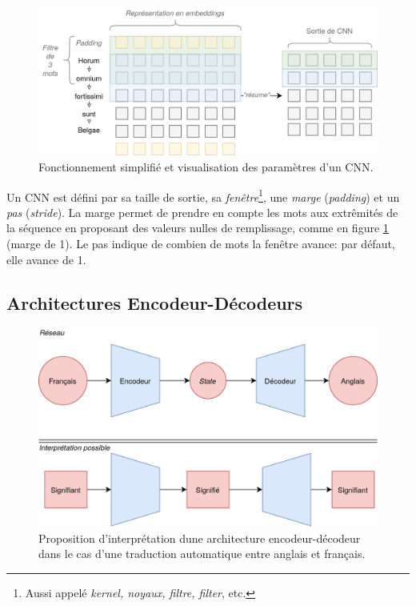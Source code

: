 \begin{figure}[h]
    \centering
    \includegraphics[width=\linewidth]{results/deep-learning/explanations/CNN.png}
    \caption{Fonctionnement simplifié et visualisation des paramètres d'un CNN.}
    \label{fig:deep-learning:cnn-tal}
\end{figure}

Un CNN est défini par sa taille de sortie, sa \textit{fenêtre}\footnote{Aussi appelé \textit{kernel, noyaux, filtre, filter}, etc.}, une \textit{marge} (\textit{padding}) et un \textit{pas} (\textit{stride}). La marge permet de prendre en compte les mots aux extrêmités de la séquence en proposant des valeurs nulles de remplissage, comme en figure \ref{fig:deep-learning:cnn-tal} (marge de 1). Le pas indique de combien de mots la fenêtre avance: par défaut, elle avance de 1. 

\subsection{Architectures Encodeur-Décodeurs}
\label{deep-learning:encoder-decoder}

\begin{figure}[h]
    \centering
    \includegraphics[width=\linewidth]{results/deep-learning/explanations/EncodeurDecodeur.png}
    \caption{Proposition d'interprétation dune architecture encodeur-décodeur dans le cas d'une traduction automatique entre anglais et français.}
    \label{fig:deep-learning:encoder-decoder}
\end{figure}
